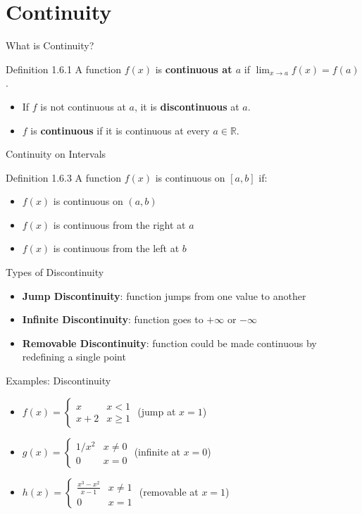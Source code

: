 \documentclass[aspectratio=169]{beamer}
\newcommand{\limx}[2]{\lim_{x \to #1} #2}
\begin{document}
\section{Continuity}

\begin{frame}{What is Continuity?}
\begin{block}{Definition 1.6.1}
A function $f(x)$ is \textbf{continuous at $a$} if $\limx{a}{f(x)} = f(a)$.
\end{block}
\begin{itemize}
  \item If $f$ is not continuous at $a$, it is \textbf{discontinuous} at $a$.
  \item $f$ is \textbf{continuous} if it is continuous at every $a \in \mathbb{R}$.
\end{itemize}
\end{frame}

\begin{frame}{Continuity on Intervals}
\begin{block}{Definition 1.6.3}
A function $f(x)$ is continuous on $[a, b]$ if:
\begin{itemize}
  \item $f(x)$ is continuous on $(a, b)$
  \item $f(x)$ is continuous from the right at $a$
  \item $f(x)$ is continuous from the left at $b$
\end{itemize}
\end{block}
\end{frame}

\begin{frame}{Types of Discontinuity}
\begin{itemize}
  \item \textbf{Jump Discontinuity}: function jumps from one value to another
  \item \textbf{Infinite Discontinuity}: function goes to $+\infty$ or $-\infty$
  \item \textbf{Removable Discontinuity}: function could be made continuous by redefining a single point
\end{itemize}
\end{frame}

\begin{frame}{Examples: Discontinuity}
\begin{itemize}
  \item $f(x) = \begin{cases} x & x < 1 \\ x+2 & x \geq 1 \end{cases}$ (jump at $x=1$)
  \item $g(x) = \begin{cases} 1/x^2 & x \neq 0 \\ 0 & x = 0 \end{cases}$ (infinite at $x=0$)
  \item $h(x) = \begin{cases} \frac{x^3-x^2}{x-1} & x \neq 1 \\ 0 & x = 1 \end{cases}$ (removable at $x=1$)
\end{itemize}
\end{frame}
\end{document}
